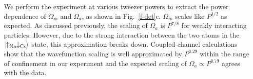 \documentclass[aps,prl,twocolumn,10pt,superscriptaddress]{revtex4-1}
\begin{document}
We perform the experiment at various tweezer powers to extract the power dependence of $ \Omega_m $ and $ \Omega_a $, as shown in Fig.~\ref{f-det}c. $ \Omega_m $ scales like $ P^{1/2} $ as expected. As discussed previously, the scaling of $ \Omega_a $ is $P^{7/8}$ for weakly interacting particles.
However, due to the strong interaction between the two atoms in the $\ket{\uparrow_{\text{Na}}\downarrow_{\text{Cs}}}$ state, this approximation breaks down.
Coupled-channel calculations show that the wavefunction scaling
is well approximated by $P^{0.29}$ within the range of confinement in our experiment and the expected scaling of $ \Omega_a \propto P^{0.79} $ agrees with the data.




\end{document}
